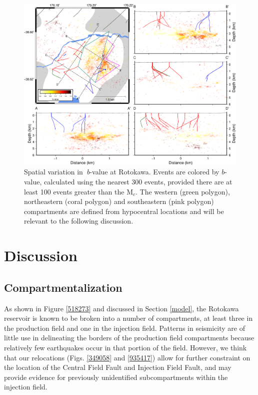 \begin{figure}[h!]
\begin{center}
\includegraphics[width=1.00\columnwidth]{Chapter_4_Rot/figures/merc_Rot_dets_just_GC_bval_map/merc_Rot_dets_just_GC_bval_map_PS_max300_min100_maxlike_comps}
\caption[Rotokawa $b$-value map]{{
Spatial variation in~\emph{b}-value at Rotokawa. Events are colored by
$b$-value, calculated using the nearest 300 events, provided there are at
least 100 events greater than the M$_{c}$. The western (green polygon), northeastern (coral polygon) and southeastern (pink polygon) compartments are defined from hypocentral locations and will be relevant to the following discussion.
{\label{610416}}%
}}
\end{center}
\end{figure}

\section{Discussion}
\subsection{Compartmentalization}
As shown in Figure \ref{518273} and discussed in Section \ref{model}, the Rotokawa reservoir is known to be broken into a number of compartments, at least three in the production field and one in the injection field. Patterns in seismicity are of little use in delineating the borders of the production field compartments because relatively few earthquakes occur in that portion of the field. However, we think that our relocations (Figs. \ref{349058} and \ref{935417}) allow for further constraint on the location of the Central Field Fault and Injection Field Fault, and may provide evidence for previously unidentified subcompartments within the injection field.

